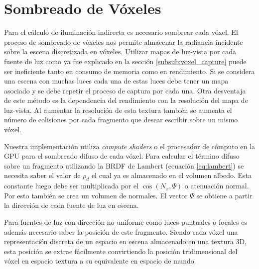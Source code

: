\section{Sombreado de Vóxeles} %
\label{sec:sombreado_de_voxeles}
Para el cálculo de iluminación indirecta es necesario sombrear cada vóxel. El proceso de sombreado de vóxeles nos permite almacenar la radiancia incidente sobre la escena discretizada en vóxeles. Utilizar mapas de luz-vista por cada fuente de luz como ya fue explicado en la sección \ref{subsub:voxel_capture} puede ser ineficiente tanto en consumo de memoria como en rendimiento. Si se considera una escena con muchas luces cada una de estas luces debe tener un mapa asociado y se debe repetir el proceso de captura por cada una. Otra desventaja de este método es la dependencia del rendimiento con la resolución del mapa de luz-vista. Al aumentar la resolución de esta textura también se aumenta el número de colisiones por cada fragmento que desear escribir sobre un mismo vóxel.

Nuestra implementación utiliza \emph{compute shaders} o el procesador de cómputo en la \ac{GPU} para el sombreado difuso de cada vóxel. Para calcular el término difuso sobre un fragmento utilizando la \ac{BRDF} de Lambert (ecuación \ref{eq:lambert}) se necesita saber el valor de $\rho_{d}$ el cual ya es almacenado en el volumen albedo. Esta constante luego debe ser multiplicada por el $\cos(N_{x}, \Psi)$ o atenuación normal. Por esto también se crea un volumen de normales. El vector $\Psi$ se obtiene a partir la dirección de cada fuente de luz en escena.

Para fuentes de luz con dirección no uniforme como luces puntuales o focales es además necesario saber la posición de este fragmento. Siendo cada vóxel una representación discreta de un espacio en escena almacenado en una textura 3D, esta posición se extrae fácilmente convirtiendo la posición tridimensional del vóxel en espacio textura a su equivalente en espacio de mundo.

